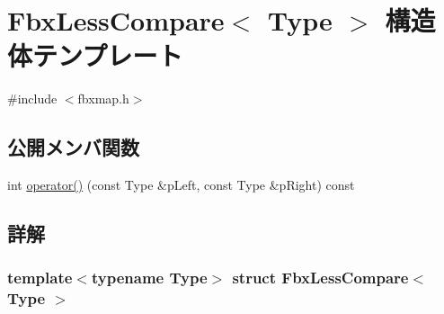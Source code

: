 \hypertarget{struct_fbx_less_compare}{}\section{Fbx\+Less\+Compare$<$ Type $>$ 構造体テンプレート}
\label{struct_fbx_less_compare}


{\ttfamily \#include $<$fbxmap.\+h$>$}

\subsection*{公開メンバ関数}
\begin{DoxyCompactItemize}
\item 
int \hyperlink{struct_fbx_less_compare_ae928c1cd53fbd36a8ed7497b4d6accc9}{operator()} (const Type \&p\+Left, const Type \&p\+Right) const
\end{DoxyCompactItemize}


\subsection{詳解}
\subsubsection*{template$<$typename Type$>$\newline
struct Fbx\+Less\+Compare$<$ Type $>$}


